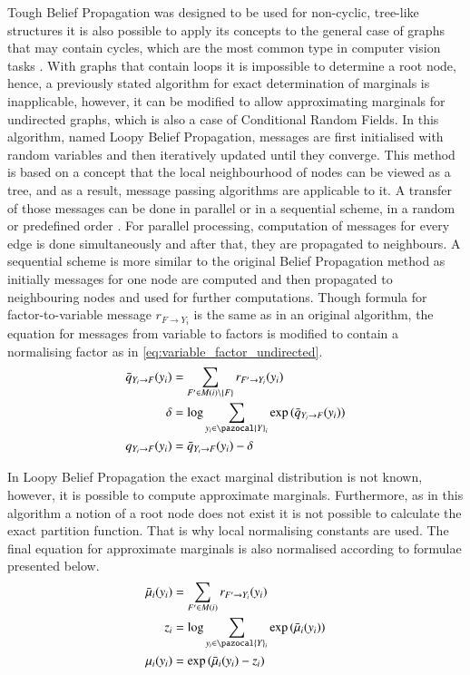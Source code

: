 Tough Belief Propagation was designed to be used for non-cyclic, tree-like structures it is also possible to apply its concepts to the general case of graphs that may contain cycles, which are the most common type in computer vision tasks \cite{lbp_byung}. With graphs that contain loops it is impossible to determine a root node, hence, a previously stated algorithm for exact determination of marginals is inapplicable, however, it can be modified to allow approximating marginals for undirected graphs, which is also a case of Conditional Random Fields. In this algorithm, named Loopy Belief Propagation, messages are first initialised with random variables and then iteratively updated until they converge. This method is based on a concept that the local neighbourhood of nodes can be viewed as a tree, and as a result, message passing algorithms are applicable to it. A transfer of those messages can be done in parallel or in a sequential scheme, in a random or predefined order \cite{MRFSurvey}. For parallel processing, computation of messages for every edge is done simultaneously and after that, they are propagated to neighbours. A sequential scheme is more similar to the original Belief Propagation method as initially messages for one node are computed and then propagated to neighbouring nodes and used for further computations. Though formula for factor-to-variable message $r_{F\rightarrow Y_i}$ is the same as in an original algorithm, the equation for messages from variable to factors is modified to contain a normalising factor as in \ref{eq:variable_factor_undirected}.
\begin{align}
    \label{eq:variable_factor_undirected}
    \bar{q}_{Y_i\rightarrow F}(y_i) &= \sum_{F' \in M(i) \setminus \left \{ F \right \} }{ r_{F' \rightarrow Y_i}(y_i)} \\
    \delta &= \log{\sum_{y_i \in \pazocal{Y}_i}{\exp{( \bar{q}_{Y_i\rightarrow F}(y_i)})}} \\
    q_{Y_i\rightarrow F}(y_i) &= \bar{q}_{Y_i\rightarrow F}(y_i) - \delta
\end{align}

In Loopy Belief Propagation the exact marginal distribution is not known, however, it is possible to compute approximate marginals. Furthermore, as in this algorithm a notion of a root node does not exist it is not possible to calculate the exact partition function. That is why local normalising constants are used. The final equation for approximate marginals is also normalised according to formulae presented below.
\begin{align}
    \bar{\mu}_i (y_i) &= \sum_{F' \in M(i)}{r_{F'\rightarrow Y_i}(y_i)} \\
    z_i &= \log{\sum_{y_i \in \pazocal{Y}_i}{\exp{( \bar{\mu}_i (y_i))}}} \\
   \mu_i (y_i) &= \exp{(\bar{\mu}_i (y_i) - z_i)}
\end{align}

